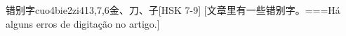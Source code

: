 \begin{EntryWithPhonetic}{错别字}{cuo4bie2zi4}{13,7,6}{⾦、⼑、⼦}[HSK 7-9]
  [文章里有一些错别字。===Há alguns erros de digitação no artigo.]
\end{EntryWithPhonetic}
